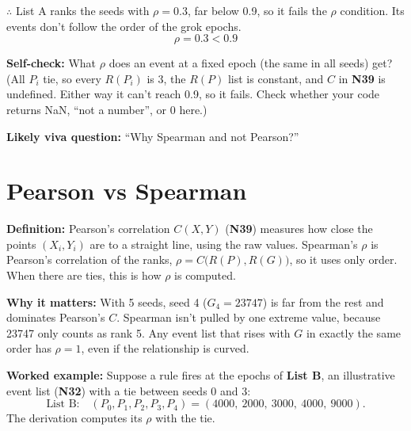 \documentclass[11pt,a4paper,oneside,openany]{report}
\newcommand{\gl}[1]{\textbf{#1}}   %
\newcommand{\fdef}{\textbf{Definition:} }
\newcommand{\fwhy}{\par\textbf{Why it matters:} }
\newcommand{\fex}{\par\textbf{Worked example:} }
\newcommand{\fself}{\par\textbf{Self-check:} }
\newcommand{\fviva}{\par\textbf{Likely viva question:} }
\begin{document}
$\therefore$ List A ranks the seeds with $\rho = 0.3$, far below 0.9, so it fails the $\rho$ condition. Its events don't follow the order of the grok epochs.
\[\boxed{\rho = 0.3 < 0.9}\]

\fself What $\rho$ does an event at a fixed epoch (the same in all seeds) get? (All $P_i$ tie, so every $R(P_i)$ is 3, the $R(P)$ list is constant, and $C$ in \gl{N39} is undefined. Either way it can't reach 0.9, so it fails. Check whether your code returns NaN, ``not a number'', or 0 here.)
\fviva ``Why Spearman and not Pearson?''

\section{Pearson vs Spearman}
\fdef Pearson's correlation $C(X, Y)$ (\gl{N39}) measures how close the points $(X_i, Y_i)$ are to a straight line, using the raw values. Spearman's $\rho$ is Pearson's correlation of the ranks, $\rho = C\big(R(P), R(G)\big)$, so it uses only order. When there are ties, this is how $\rho$ is computed.
\fwhy With 5 seeds, seed 4 ($G_4 = 23747$) is far from the rest and dominates Pearson's $C$. Spearman isn't pulled by one extreme value, because 23747 only counts as rank 5. Any event list that rises with $G$ in exactly the same order has $\rho = 1$, even if the relationship is curved.
\fex Suppose a rule fires at the epochs of \textbf{List B}, an illustrative event list (\gl{N32}) with a tie between seeds 0 and 3:
\[
\text{List B:}\quad (P_0, P_1, P_2, P_3, P_4) = (4000,\ 2000,\ 3000,\ 4000,\ 9000).
\]
The derivation computes its $\rho$ with the tie.
\end{document}
